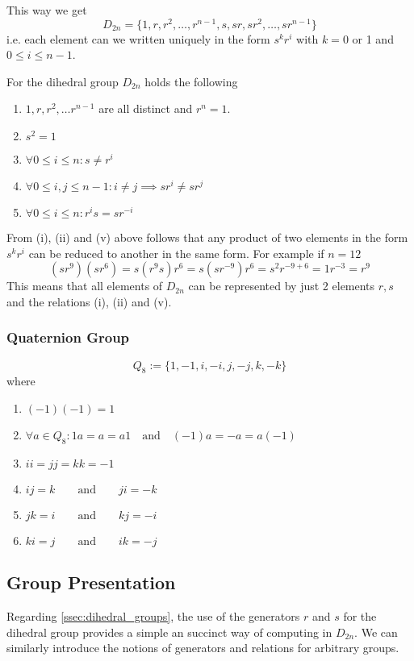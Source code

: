 This way we get
\[D_{2n} = \{1, r, r^2, \ldots, r^{n-1}, s, sr, sr^2, \ldots, sr^{n-1}\}\]
i.e. each element can we written uniquely in the form \(s^kr^i\) with \(k = 0\) or 1 and \(0 \leq i \leq n-1\).
\begin{proposition}
   For the dihedral group \(D_{2n}\) holds the following
   \begin{enumerate}[label=\roman*, align=Center]
      \item \(1, r, r^2, \ldots r^{n-1}\) are all distinct and \(r^n = 1\).
      \item \(s^2 = 1\)
      \item \(\forall 0 \leq i \leq n: s \neq r^i\)
      \item \(\forall 0 \leq i,j \leq n-1: i \neq j \implies sr^i \neq sr^j\)
      \item \(\forall 0 \leq i \leq n: r^is = sr^{-i}\)
   \end{enumerate}
\end{proposition}
From (i), (ii) and (v) above follows that any product of two elements in the form \(s^kr^i\) can be reduced to another in the same form.
For example if \(n = 12\)
\[(sr^9)(sr^6) = s(r^9s)r^6 = s(sr^{-9})r^6 = s^2r^{-9+6} = 1 r^{-3} = r^9\]
This means that all elements of \(D_{2n}\) can be represented by just 2 elements \(r, s\) and the relations (i), (ii) and (v).

\subsubsection{Quaternion Group}
\begin{definition}
   \[Q_8 := \{1, -1, i, -i, j, -j, k, -k\}\]
   where
   \begin{enumerate}[label=\roman*, align=Center]
      \item \((-1)(-1) = 1\)
      \item \(\forall a \in Q_8: 1a = a = a1 \quad\text{and}\quad (-1)a = -a = a(-1)\)
      \item \(ii = jj = kk = -1\)
      \item \(ij = k \qquad\text{and}\qquad ji = -k\)
      \item \(jk = i \qquad\text{and}\qquad kj = -i\)
      \item \(ki = j \qquad\text{and}\qquad ik = -j\)
   \end{enumerate}
\end{definition}

\subsection{Group Presentation}
Regarding \cref{ssec:dihedral_groups}, the use of the generators \(r\) and \(s\) for the dihedral group provides a simple an succinct way of computing in \(D_{2n}\).
We can similarly introduce the notions of generators and relations for arbitrary groups.

